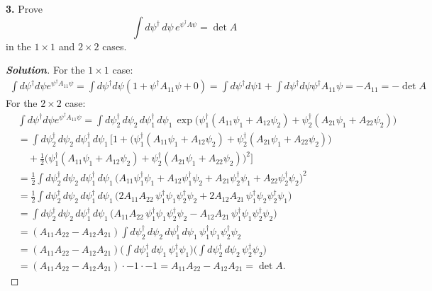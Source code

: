 \documentclass[11pt]{article}
\newenvironment{solution}[1][]{\begin{proof}[\textbf{Solution}]}{\end{proof}}
\begin{document}
\begin{tcolorbox}[problem]
\textbf{3.} Prove $$\int d\psi^\dagger\,d\psi\,e^{\psi^\dagger A\psi}=\det A$$ in the $1\times 1$ and $2\times 2$ cases.
\end{tcolorbox}
\begin{solution}[12.3]
	For the $1\times 1$ case:
	\[
	\begin{aligned}
		\int d\psi^\dagger d\psi e^{\psi^\dagger A_{11}\psi}=	\int d\psi^\dagger d\psi \left(1+\psi^\dagger A_{11}\psi+0\right)
		=\int d\psi^\dagger d\psi 1+\int d\psi^\dagger d\psi \psi^\dagger A_{11}\psi=-A_{11}=\boxed{-\det A}
		\end{aligned}
	\]
		For the $2\times 2$ case:
	$$
	\begin{aligned}
		&\int d\psi^\dagger d\psi e^{\psi^\dagger A_{11}\psi}=\int d\psi_2^\dagger\,d\psi_2\,d\psi_1^\dagger\,d\psi_1\,
		\exp\!\Big(\psi_1^\dagger(A_{11}\psi_1+A_{12}\psi_2)+\psi_2^\dagger(A_{21}\psi_1+A_{22}\psi_2)\Big)\\
		&=\int d\psi_2^\dagger\,d\psi_2\,d\psi_1^\dagger\,d\psi_1\,
		\Bigg[1+\Big(\psi_1^\dagger(A_{11}\psi_1+A_{12}\psi_2)+\psi_2^\dagger(A_{21}\psi_1+A_{22}\psi_2)\Big)\\
		&\quad+\frac12\Big(\psi_1^\dagger(A_{11}\psi_1+A_{12}\psi_2)+\psi_2^\dagger(A_{21}\psi_1+A_{22}\psi_2)\Big)^2\Bigg]\\
		&=\frac12\int d\psi_2^\dagger\,d\psi_2\,d\psi_1^\dagger\,d\psi_1\,
		\Big(A_{11}\psi_1^\dagger\psi_1+A_{12}\psi_1^\dagger\psi_2+A_{21}\psi_2^\dagger\psi_1+A_{22}\psi_2^\dagger\psi_2\Big)^2\\
		&=\frac12\int d\psi_2^\dagger\,d\psi_2\,d\psi_1^\dagger\,d\psi_1\,
		\Big(2A_{11}A_{22}\,\psi_1^\dagger\psi_1\psi_2^\dagger\psi_2+2A_{12}A_{21}\,\psi_1^\dagger\psi_2\psi_2^\dagger\psi_1\Big)\\
		&=\int d\psi_2^\dagger\,d\psi_2\,d\psi_1^\dagger\,d\psi_1\,
		\Big(A_{11}A_{22}\,\psi_1^\dagger\psi_1\psi_2^\dagger\psi_2-A_{12}A_{21}\,\psi_1^\dagger\psi_1\psi_2^\dagger\psi_2\Big)\\
		&=(A_{11}A_{22}-A_{12}A_{21})\int d\psi_2^\dagger\,d\psi_2\,d\psi_1^\dagger\,d\psi_1\,\psi_1^\dagger\psi_1\psi_2^\dagger\psi_2\\
		&=(A_{11}A_{22}-A_{12}A_{21})\Big(\int d\psi_1^\dagger\,d\psi_1\,\psi_1^\dagger\psi_1\Big)\Big(\int d\psi_2^\dagger\,d\psi_2\,\psi_2^\dagger\psi_2\Big)\\
		&=(A_{11}A_{22}-A_{12}A_{21})\cdot -1\cdot -1
		=A_{11}A_{22}-A_{12}A_{21}
		=\boxed{\det A}.
	\end{aligned}
	$$
\end{solution}
\end{document}
